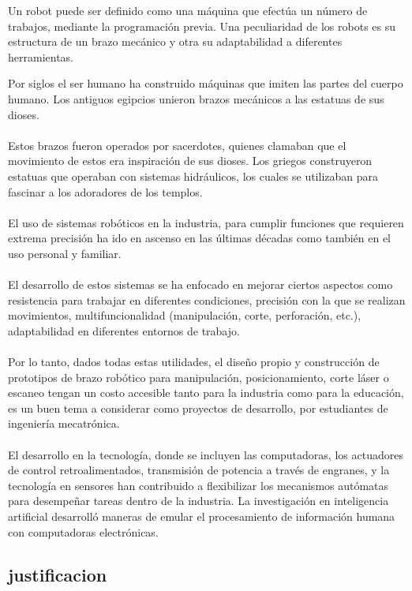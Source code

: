 \documentclass[12pt,letterpaper]{article}
\begin{document}
\begin{flushleft}
Un robot puede ser definido como una máquina que efectúa un número de trabajos, mediante la programación previa. Una peculiaridad de los robots es su estructura de un brazo mecánico y otra su adaptabilidad a diferentes herramientas.
\end{flushleft}
Por siglos el ser humano ha construido máquinas que imiten las partes del cuerpo humano. Los antiguos egipcios unieron brazos mecánicos a las estatuas de sus dioses.
\\\\ 
Estos brazos fueron operados por sacerdotes, quienes clamaban que el movimiento de estos era inspiración de sus dioses. Los griegos construyeron estatuas que operaban con sistemas hidráulicos, los cuales se utilizaban para fascinar a los adoradores de los templos.
\\\\
El uso de sistemas robóticos en la industria, para cumplir funciones que requieren extrema precisión ha ido en ascenso en las últimas décadas como también en el uso personal y familiar.
\\\\
El desarrollo de estos sistemas se ha enfocado en mejorar ciertos aspectos como resistencia para trabajar en diferentes condiciones, precisión con la que se realizan movimientos, multifuncionalidad (manipulación, corte, perforación, etc.), adaptabilidad en diferentes entornos de trabajo.
\\\\
Por lo tanto, dados todas estas utilidades, el diseño propio y construcción de prototipos de brazo robótico para manipulación, posicionamiento, corte láser o escaneo tengan un costo accesible tanto para la industria como para la educación, es un buen tema a considerar como proyectos de desarrollo, por estudiantes de ingeniería mecatrónica.
\\\\
El desarrollo en la tecnología, donde se incluyen las computadoras, los actuadores de control retroalimentados, transmisión de potencia a través de engranes, y la tecnología en sensores han contribuido a flexibilizar los mecanismos autómatas para desempeñar tareas dentro de la industria. La investigación en inteligencia artificial desarrolló maneras de emular el procesamiento de información humana con computadoras electrónicas.

\newpage
\subsection*{justificacion}
\end{document}
